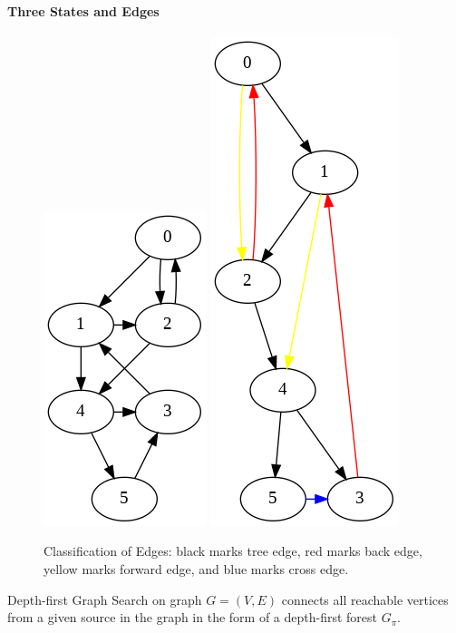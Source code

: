 \documentclass[../main.tex]{subfiles}
\begin{document}
\paragraph{Three States and Edges}
\begin{figure}[!ht]
    \centering
       \includegraphics[width=0.33\columnwidth]{fig/directed_cyclic_graph_2.png}
     \includegraphics[width=0.28\columnwidth]{fig/depth_first_graph_search_edges(1).png}
    \caption{Classification of Edges: black marks tree edge, red marks back edge, yellow marks forward edge, and blue marks cross edge.}
    \label{fig:depth_first_graph_search_edges}
\end{figure}
Depth-first Graph Search on graph $G=(V, E)$ connects all reachable vertices from a given source in the graph in the form of  a depth-first forest $G_\pi$. 
\end{document}
